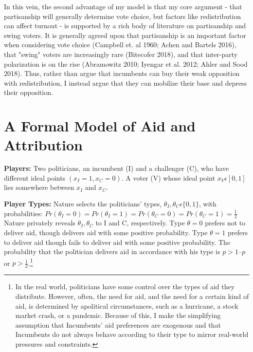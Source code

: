 \documentclass[12pt]{paper}
\begin{document}
In this vein, the second advantage of my model is that my core argument - that partisanship will generally determine vote choice, but factors like redistribution can affect turnout - is supported by a rich body of literature on partisanship and swing voters. It is generally agreed upon that partisanship is an important factor when considering vote choice (Campbell et. al 1960; Achen and Bartels 2016), that "swing" voters are increasingly rare (Bitecofer 2018), and that inter-party polarization is on the rise (Abramowitz 2010; Iyengar et al. 2012; Ahler and Sood 2018). Thus, rather than argue that incumbents can buy their weak opposition with redistribution, I instead argue that they can mobilize their base and depress their opposition.

\section{A Formal Model of Aid and Attribution}
\textbf{Players:} Two politicians, an incumbent (I) and a challenger (C), who have different ideal points $(x_I=1, x_C=0)$. A voter (V) whose ideal point $x_V \epsilon [0,1]$ lies somewhere between $x_I$ and $x_C.$

\textbf{Player Types:} Nature selects the politicians’ types, $\theta_I, \theta_C \epsilon \{0,1\}$, with probabilities: $Pr(\theta_I=0)=Pr(\theta_I=1)=Pr(\theta_C=0)=Pr(\theta_C=1)= \frac{1}{2}$ Nature privately reveals $\theta_I,\theta_C$ to I and C, respectively. Type $\theta=0$ prefers not to deliver aid, though delivers aid with some positive probability. Type $\theta=1$ prefers to deliver aid though fails to deliver aid with some positive probability. The probability that the politician delivers aid in accordance with his type is $p > 1 – p$ or $p > \frac{1}{2}$.\footnote{In the real world, politicians have some control over the types of aid they distribute. However, often, the need for aid, and the need for a certain kind of aid, is determined by apolitical circumstances, such as a hurricane, a stock market crash, or a pandemic. Because of this, I make the simplifying assumption that Incumbents' aid preferences are exogenous and that Incumbents do not always behave according to their type to mirror real-world pressures and constraints.}
\end{document}
